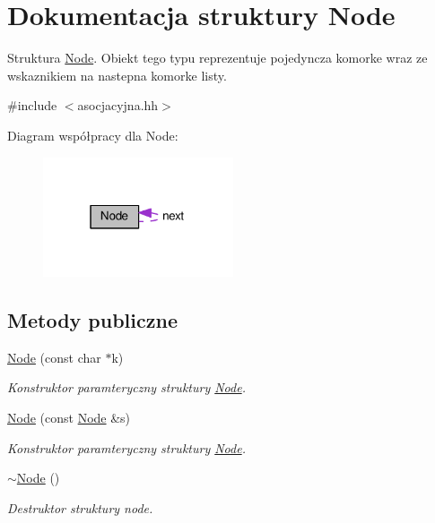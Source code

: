 \hypertarget{struct_node}{\section{Dokumentacja struktury Node}
\label{struct_node}
}


Struktura \hyperlink{struct_node}{Node}. Obiekt tego typu reprezentuje pojedyncza komorke wraz ze wskaznikiem na nastepna komorke listy.  




{\ttfamily \#include $<$asocjacyjna.\-hh$>$}



Diagram współpracy dla Node\-:
\nopagebreak
\begin{figure}[H]
\begin{center}
\leavevmode
\includegraphics[width=159pt]{struct_node__coll__graph}
\end{center}
\end{figure}
\subsection*{Metody publiczne}
\begin{DoxyCompactItemize}
\item 
\hyperlink{struct_node_ac43f5fef98396587efbea0705d1c7f29}{Node} (const char $\ast$k)
\begin{DoxyCompactList}\small\item\em Konstruktor paramteryczny struktury \hyperlink{struct_node}{Node}. \end{DoxyCompactList}\item 
\hyperlink{struct_node_a89c6f1320c2e41800646aa3bdaadad56}{Node} (const \hyperlink{struct_node}{Node} \&s)
\begin{DoxyCompactList}\small\item\em Konstruktor paramteryczny struktury \hyperlink{struct_node}{Node}. \end{DoxyCompactList}\item 
\hyperlink{struct_node_aa0840c3cb5c7159be6d992adecd2097c}{$\sim$\-Node} ()
\begin{DoxyCompactList}\small\item\em Destruktor struktury node. \end{DoxyCompactList}\end{DoxyCompactItemize}
